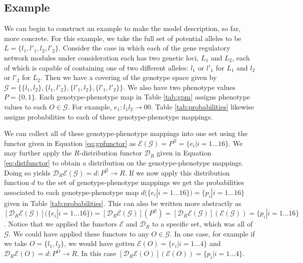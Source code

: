 \documentclass[10pt]{article}
\begin{document}
\subsection*{Example}
We can begin to construct an example to make the model description, so far, more concrete. For this example, we take the full set of potential alleles to be $L = \{ l_1,l'_1,l_2,l'_2 \}$. Consider the case in which each of the gene regulatory network modules under consideration each has two genetic loci, $L_1$ and $L_2$, each of which is capable of containing one of two different alleles: $l_1$ or $l'_1$ for $L_1$ and $l_2$ or $l'_2$ for $L_2$. Then we have a covering of the genotype space given by $\mathcal{G} = \{\{l_1,l_2 \},\{l_1,l'_2 \},\{l'_1,l_2\},\{l'_1,l'_2\} \}$. We also have two phenotype values $P = \{0, 1\}$. Each genotype-phenotype map in Table \ref{tab:gpm} assigns phenotype values to each $O \in \mathcal{G}$. For example, $e_1 \colon	l_1 l_2 \rightarrow 00$. Table \ref{tab:probabilities} likewise assigns probabilities to each of these genotype-phenotype mappings.

We can collect all of these genotype-phenotype mappings into one set using the functor given in Equation \ref{eq:gpfunctor} as $\mathcal{E}(\mathcal{G}) = P^{\mathcal{G}} = \{e_i | i=1 \ldots 16 \}$. We may further apply the $R$-distribution functor $\mathcal{D}_R$ given in Equation \ref{eq:distfunctor} to obtain a distribution on the genotype-phenotype mappings. Doing so yields  $\mathcal{D}_R\mathcal{E}(\mathcal{G})=d \colon P^\mathcal{G} \rightarrow R$. If we now apply this distribution function $d$ to the set of genotype-phenotype mappings we get the probabilities associated to each genotype-phenotype map $d(\{e_i | i=1 \ldots 16 \}) = \{p_i|i=1 \ldots 16\}$ given in Table \ref{tab:probabilities}. This can also be written more abstractly as $\left[\mathcal{D}_R\mathcal{E}(\mathcal{G})\right](\{e_i | i=1 \ldots 16 \}) = \left[\mathcal{D}_R\mathcal{E}(\mathcal{G})\right](P^\mathcal{G}) = \left[\mathcal{D}_R\mathcal{E}(\mathcal{G})\right](\mathcal{E}(\mathcal{G})) = \{p_i|i=1 \ldots 16\}$. Notice that we applied the functors $\mathcal{E}$ and $\mathcal{D}_R$ to a specific set, which was all of $\mathcal{G}$. We could have applied these functors to any $O \in \mathcal{G}$. In one case, for example if we take $O = \{l_1, l_2\}$, we would have gotten $\mathcal{E}(O) = \{e_i|i=1 \ldots 4\}$ and $\mathcal{D}_R\mathcal{E}(O) = d \colon P^O \rightarrow R$. In this case $\left[\mathcal{D}_R\mathcal{E}(O)\right](\mathcal{E}(O)) = \{p_i|i=1 \ldots 4\}$.
\end{document}

